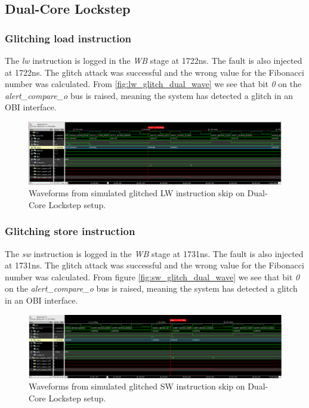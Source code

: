 \subsection{Dual-Core Lockstep}

\subsubsection{Glitching load instruction}

The \textit{lw} instruction is logged in the \textit{WB} stage at 1722ns. The fault is also injected at 1722ns. The glitch attack was successful and the wrong value for the Fibonacci number was calculated. From \autoref{fig:lw_glitch_dual_wave} we see that bit \textit{0} on the \textit{alert\_compare\_o} bus is raised, meaning the system has detected a glitch in an OBI interface. 

\begin{figure}[h!]
    \centering
    \includegraphics[width=\textwidth]{docs/images/lw_glitch_dual_core.png}
    \caption{Waveforms from simulated glitched LW instruction skip on Dual-Core Lockstep setup.}
    \label{fig:lw_glitch_dual_wave}
\end{figure}

\subsubsection{Glitching store instruction}

The \textit{sw} instruction is logged in the \textit{WB} stage at 1731ns. The fault is also injected at 1731ns. The glitch attack was successful and the wrong value for the Fibonacci number was calculated. From figure \autoref{fig:sw_glitch_dual_wave} we see that bit \textit{0} on the \textit{alert\_compare\_o} bus is raised, meaning the system has detected a glitch in an OBI interface. 

\begin{figure}[h!]
    \centering
    \includegraphics[width=\textwidth]{docs/images/sw_glitch_dual_core.png}
    \caption{Waveforms from simulated glitched SW instruction skip on Dual-Core Lockstep setup.}
    \label{fig:sw_glitch_dual_wave}
\end{figure}

